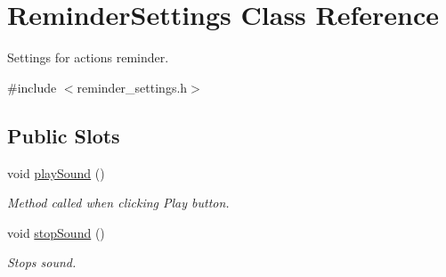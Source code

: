 \hypertarget{class_reminder_settings}{\section{Reminder\-Settings Class Reference}
\label{class_reminder_settings}
}


Settings for actions reminder.  




{\ttfamily \#include $<$reminder\-\_\-settings.\-h$>$}

\subsection*{Public Slots}
\begin{DoxyCompactItemize}
\item 
void \hyperlink{class_reminder_settings_aaebc21b62262f96a18dd4d7fd8b776b3}{play\-Sound} ()
\begin{DoxyCompactList}\small\item\em Method called when clicking Play button. \end{DoxyCompactList}\item 
void \hyperlink{class_reminder_settings_ae3cc184e347e4dccdbc1eff20dbc87b3}{stop\-Sound} ()
\begin{DoxyCompactList}\small\item\em Stops sound. \end{DoxyCompactList}\end{DoxyCompactItemize}
